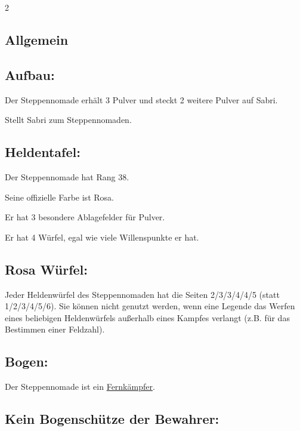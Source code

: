 \documentclass[10pt, a4paper, oneside]{book}
\begin{document}
\begin{multicols*}{2}\raggedcolumns


\begin{nobgcolor}

\section{Allgemein}




\subsection{Aufbau:}

Der Steppennomade erhält 3 Pulver und steckt 2 weitere Pulver auf Sabri.
\supercite{mh-begleitheft}

Stellt Sabri zum Steppennomaden.
\supercite{mh-begleitheft}



\subsection{Heldentafel:}

Der Steppennomade hat Rang 38.

Seine offizielle Farbe ist Rosa.

Er hat 3 besondere Ablagefelder für Pulver.

Er hat 4 Würfel, egal wie viele Willenspunkte er hat. 




\subsection{Rosa Würfel:}

Jeder Heldenwürfel des Steppennomaden hat die Seiten 2/3/3/4/4/5 (statt 1/2/3/4/5/6). Sie können nicht genutzt werden, wenn eine Legende das Werfen eines beliebigen Heldenwürfels außerhalb eines Kampfes verlangt (z.B. für das Bestimmen einer Feldzahl).
\supercite{88552}


\subsection{Bogen:}

Der Steppennomade ist ein \hyperref[fernkaempfer]{Fernkämpfer}.



\subsection{Kein Bogenschütze der Bewahrer:}


\end{nobgcolor}
\end{multicols*}
\end{document}
